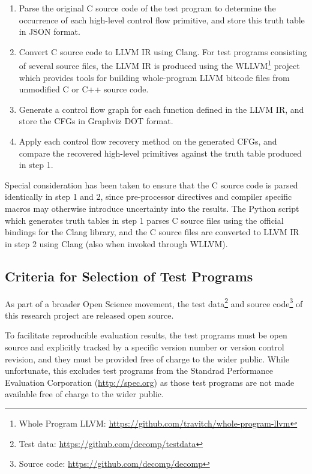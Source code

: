 \documentclass[12pt, a4paper]{article}
\begin{document}
\begin{enumerate}
	\item Parse the original C source code of the test program to determine the occurrence of each high-level control flow primitive, and store this truth table in JSON format.
	\item Convert C source code to LLVM IR using Clang. For test programs consisting of several source files, the LLVM IR is produced using the WLLVM\footnote{Whole Program LLVM: \url{https://github.com/travitch/whole-program-llvm}} project which provides tools for building whole-program LLVM bitcode files from unmodified C or C++ source code.
	\item Generate a control flow graph for each function defined in the LLVM IR, and store the CFGs in Graphviz DOT format.
	\item Apply each control flow recovery method on the generated CFGs, and compare the recovered high-level primitives against the truth table produced in step 1.
\end{enumerate}

Special consideration has been taken to ensure that the C source code is parsed identically in step 1 and 2, since pre-processor directives and compiler specific macros may otherwise introduce uncertainty into the results. The Python script which generates truth tables in step 1 parses C source files using the official bindings for the Clang library, and the C source files are converted to LLVM IR in step 2 using Clang (also when invoked through WLLVM).


\subsection{Criteria for Selection of Test Programs}

As part of a broader Open Science movement, the test data\footnote{Test data: \url{https://github.com/decomp/testdata}} and source code\footnote{Source code: \url{https://github.com/decomp/decomp}} of this research project are released open source.

To facilitate reproducible evaluation results, the test programs must be open source and explicitly tracked by a specific version number or version control revision, and they must be provided free of charge to the wider public. While unfortunate, this excludes test programs from the Standrad Performance Evaluation Corporation (\url{http://spec.org}) as those test programs are not made available free of charge to the wider public.
\end{document}
